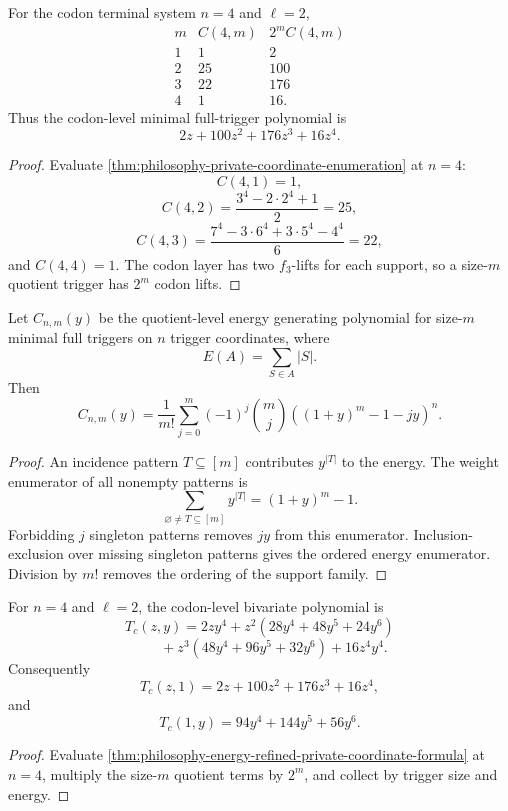 \begin{corollary}
\label{cor:philosophy-private-coordinate-codon-counts}
For the codon terminal system $n=4$ and $\ell=2$,
$$
\begin{array}{c|r|r}
  m & C(4,m) & 2^{m}C(4,m)\\
  \hline
  1 & 1 & 2\\
  2 & 25 & 100\\
  3 & 22 & 176\\
  4 & 1 & 16.
\end{array}
$$
Thus the codon-level minimal full-trigger polynomial is
$$
  2z+100z^{2}+176z^{3}+16z^{4}.
$$
\end{corollary}
\begin{proof}
Evaluate \autoref{thm:philosophy-private-coordinate-enumeration} at
$n=4$:
$$
  C(4,1)=1,
$$
$$
  C(4,2)=\frac{3^{4}-2\cdot2^{4}+1}{2}=25,
$$
$$
  C(4,3)=
  \frac{7^{4}-3\cdot6^{4}+3\cdot5^{4}-4^{4}}{6}
  =
  22,
$$
and $C(4,4)=1$. The codon layer has two $f_{3}$-lifts for each support,
so a size-$m$ quotient trigger has $2^{m}$ codon lifts.
\end{proof}

\begin{theorem}
\label{thm:philosophy-energy-refined-private-coordinate-formula}
Let $C_{n,m}(y)$ be the quotient-level energy generating polynomial for
size-$m$ minimal full triggers on $n$ trigger coordinates, where
$$
  E(A)=\sum_{S\in A}|S|.
$$
Then
$$
  C_{n,m}(y)
  =
  \frac{1}{m!}
  \sum_{j=0}^{m}
  (-1)^{j}
  \binom{m}{j}
  \left((1+y)^{m}-1-jy\right)^{n}.
$$
\end{theorem}
\begin{proof}
An incidence pattern $T\subseteq[m]$ contributes $y^{|T|}$ to the
energy. The weight enumerator of all nonempty patterns is
$$
  \sum_{\varnothing\neq T\subseteq[m]}y^{|T|}
  =
  (1+y)^{m}-1.
$$
Forbidding $j$ singleton patterns removes $jy$ from this enumerator.
Inclusion-exclusion over missing singleton patterns gives the ordered
energy enumerator. Division by $m!$ removes the ordering of the
support family.
\end{proof}

\begin{corollary}
\label{cor:philosophy-private-coordinate-codon-energy-refinement}
For $n=4$ and $\ell=2$, the codon-level bivariate polynomial is
$$
  T_{c}(z,y)
  =
  2zy^{4}
  +
  z^{2}(28y^{4}+48y^{5}+24y^{6})
$$
$$
  \qquad
  +
  z^{3}(48y^{4}+96y^{5}+32y^{6})
  +
  16z^{4}y^{4}.
$$
Consequently
$$
  T_{c}(z,1)=2z+100z^{2}+176z^{3}+16z^{4},
$$
and
$$
  T_{c}(1,y)=94y^{4}+144y^{5}+56y^{6}.
$$
\end{corollary}
\begin{proof}
Evaluate
\autoref{thm:philosophy-energy-refined-private-coordinate-formula} at
$n=4$, multiply the size-$m$ quotient terms by $2^{m}$, and collect by
trigger size and energy.
\end{proof}

